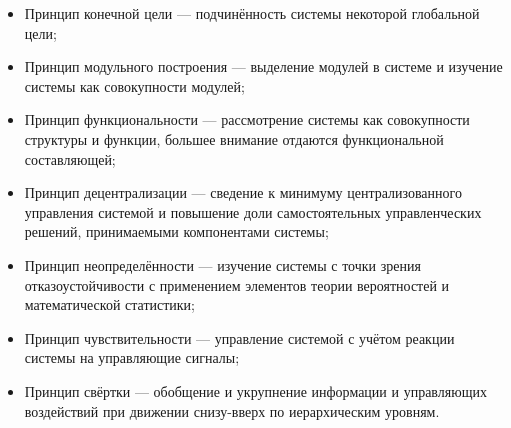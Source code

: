 \documentclass[10pt]{article}
\begin{document}
\begin{enumerate}
  \begin{itemize}
  \item{Принцип конечной цели --- подчинённость системы некоторой глобальной цели;}
  \item{Принцип модульного построения --- выделение модулей в системе и изучение системы как совокупности модулей;}
  \item{Принцип функциональности --- рассмотрение системы как совокупности структуры и функции, большее внимание отдаются функциональной составляющей;}
  \item{Принцип децентрализации --- сведение к минимуму централизованного управления системой и повышение доли самостоятельных управленческих решений, принимаемыми компонентами системы;}
  \item{Принцип неопределённости --- изучение системы с точки зрения отказоустойчивости с применением элементов теории вероятностей и математической статистики;}
  \item{Принцип чувствительности --- управление системой с учётом реакции системы на управляющие сигналы;}
  \item{Принцип свёртки --- обобщение и укрупнение информации и управляющих воздействий при движении снизу-вверх по иерархическим уровням.}
  \end{itemize}
\end{enumerate}
\end{document}
